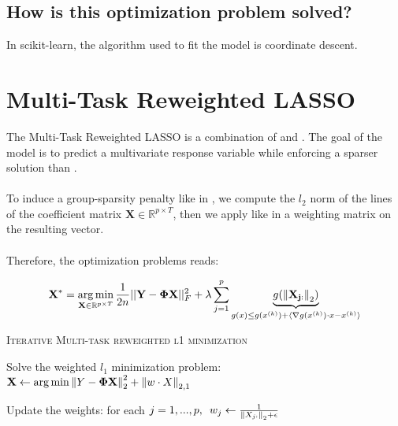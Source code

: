 \documentclass[a4paper,10pt]{article}
\theoremstyle{definition}
\begin{document}
\subsection*{How is this optimization problem solved?}

In scikit-learn, the algorithm used to fit the model is coordinate descent.

\section{Multi-Task Reweighted LASSO}
\label{section_5}

The Multi-Task Reweighted LASSO is a combination of  and . The goal of the model is to predict a multivariate response variable while enforcing a sparser solution than .
\\
\\
To induce a group-sparsity penalty like in , we compute the $l_2$ norm of the lines of the coefficient matrix $\mathbf{X} \in \mathbb{R}^{p \times T}$, then we apply like in  a weighting matrix
on the resulting vector.
\\
\\
Therefore, the optimization problems reads:

\begin{equation*}
    \mathbf{X}^* = \operatorname*{arg\,min}_{\mathbf{X} \in \mathbb{R}^{p \times T}} \frac{1}{2n} \lvert\lvert \mathbf{Y} - \mathbf{\Phi X} \rvert\rvert_F^2 + \lambda \sum_{j=1}^p \underbrace{g(\left \lVert \mathbf{X_{j:}} \right \rVert_{2})}_{g(x) \leq g(x^{(k)}) + \langle \nabla g (x^{(k)}) \cdot x - x^{(k)} \rangle }
\end{equation*}

\vskip 0.2in

{\fontsize{4}{4}\selectfont
\begin{algorithm}[h]  %
\caption{\textsc{Iterative Multi-task reweighted l1 minimization}
}
%

    {
        Solve the weighted $l_1$ minimization problem:
        $\mathbf{X} \leftarrow \operatorname*{arg\,min} \left \lVert Y -  \mathbf{\Phi} \mathbf{X} \right \rVert_2^2 + \left \lVert w \cdot X \right \rVert_{2, 1}$

        Update the weights: for each
        $j = 1, ..., p, \enspace w_j \leftarrow \frac{1}{\left \lVert X_{j:} \right \rVert_2 + \epsilon}$
    }

\end{algorithm}
}


\newpage


\end{document}
